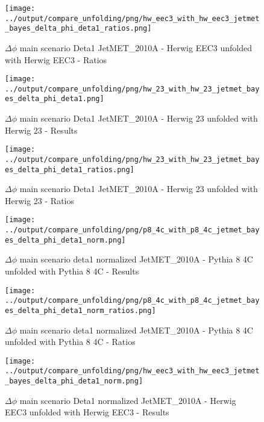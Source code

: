 \documentclass[11pt]{book}
\begin{document}
\begin{figure}[ht]
\centering
\texttt{[image: ../output/compare\_unfolding/png/hw\_eec3\_with\_hw\_eec3\_jetmet\_bayes\_delta\_phi\_deta1\_ratios.png]}
\caption{$\Delta\phi$ main scenario Deta1 JetMET\_2010A - Herwig EEC3 unfolded with Herwig EEC3 - Ratios}
\label{hw_eec3_hw_eec3_jetmet_bayes_delta_phi_deta1_b}
\end{figure}

\begin{figure}[ht]
\centering
\texttt{[image: ../output/compare\_unfolding/png/hw\_23\_with\_hw\_23\_jetmet\_bayes\_delta\_phi\_deta1.png]}
\caption{$\Delta\phi$ main scenario Deta1 JetMET\_2010A - Herwig 23 unfolded with Herwig 23 - Results}
\label{hw_23_hw_23_jetmet_bayes_delta_phi_deta1_a}
\end{figure}

\begin{figure}[ht]
\centering
\texttt{[image: ../output/compare\_unfolding/png/hw\_23\_with\_hw\_23\_jetmet\_bayes\_delta\_phi\_deta1\_ratios.png]}
\caption{$\Delta\phi$ main scenario Deta1 JetMET\_2010A - Herwig 23 unfolded with Herwig 23 - Ratios}
\label{hw_23_hw_23_jetmet_bayes_delta_phi_deta1_b}
\end{figure}


\begin{figure}[ht]
\centering
\texttt{[image: ../output/compare\_unfolding/png/p8\_4c\_with\_p8\_4c\_jetmet\_bayes\_delta\_phi\_deta1\_norm.png]}
\caption{$\Delta\phi$ main scenario deta1 normalized JetMET\_2010A - Pythia 8 4C unfolded with Pythia 8 4C - Results}
\label{p8_p8_jetmet_bayes_delta_phi_deta1_norm_a}
\end{figure}

\begin{figure}[ht]
\centering
\texttt{[image: ../output/compare\_unfolding/png/p8\_4c\_with\_p8\_4c\_jetmet\_bayes\_delta\_phi\_deta1\_norm\_ratios.png]}
\caption{$\Delta\phi$ main scenario deta1 normalized JetMET\_2010A - Pythia 8 4C unfolded with Pythia 8 4C - Ratios}
\label{p8_p8_jetmet_bayes_delta_phi_deta1_norm_b}
\end{figure}

\begin{figure}[ht]
\centering
\texttt{[image: ../output/compare\_unfolding/png/hw\_eec3\_with\_hw\_eec3\_jetmet\_bayes\_delta\_phi\_deta1\_norm.png]}
\caption{$\Delta\phi$ main scenario Deta1 normalized JetMET\_2010A - Herwig EEC3 unfolded with Herwig EEC3 - Results}
\label{hw_eec3_hw_eec3_jetmet_bayes_delta_phi_deta1_norm_a}
\end{figure}
\end{document}

